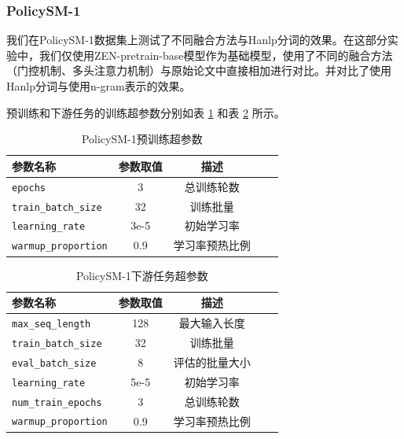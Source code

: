 \documentclass[12pt, a4paper]{ctexart}
\begin{document}
\subsubsection{PolicySM-1}
我们在PolicySM-1数据集上测试了不同融合方法与Hanlp分词的效果。在这部分实验中，我们仅使用ZEN-pretrain-base模型作为基础模型，使用了不同的融合方法（门控机制、多头注意力机制）与原始论文中直接相加进行对比。并对比了使用Hanlp分词与使用n-gram表示的效果。

预训练和下游任务的训练超参数分别如表 \ref{tab:pretrain_hyperparameters_1} 和表 \ref{tab:seqlevel_hyperparameters_1} 所示。


\begin{table}[H]
    \renewcommand{\arraystretch}{1}
    \centering
    \caption{PolicySM-1预训练超参数}
    \begin{tabular}{lcccc}
        \toprule
        \textbf{参数名称} & \textbf{参数取值} & \textbf{描述} \\
        \midrule
        \texttt{epochs} & 3 & 总训练轮数 \\ 
        \texttt{train\_batch\_size} & 32 & 训练批量 \\
        \texttt{learning\_rate} & 3e-5 & 初始学习率 \\ 
        \texttt{warmup\_proportion} & 0.9 & 学习率预热比例 \\ 
        \bottomrule
    \end{tabular}
    \label{tab:pretrain_hyperparameters_1}
\end{table}

\begin{table}[H]
    \renewcommand{\arraystretch}{1}
    \centering
    \caption{PolicySM-1下游任务超参数}
    \begin{tabular}{lcccc}
        \toprule
        \textbf{参数名称} & \textbf{参数取值} & \textbf{描述} \\ 
        \midrule
        \texttt{max\_seq\_length} & 128 & 最大输入长度\\ 
        \texttt{train\_batch\_size} & 32 & 训练批量 \\ 
        \texttt{eval\_batch\_size} & 8 & 评估的批量大小 \\
        \texttt{learning\_rate} & 5e-5 & 初始学习率 \\
        \texttt{num\_train\_epochs} & 3 & 总训练轮数 \\ 
        \texttt{warmup\_proportion} & 0.9 & 学习率预热比例 \\
        \bottomrule
    \end{tabular}
    \label{tab:seqlevel_hyperparameters_1}
\end{table}
\end{document}
